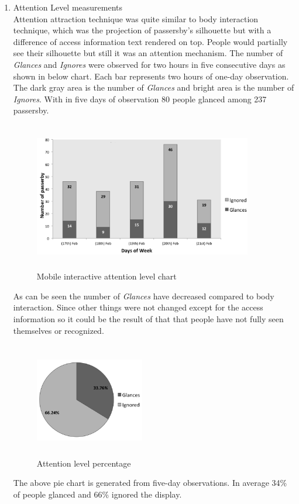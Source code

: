 \begin{enumerate}

\item Attention Level measurements \\
Attention attraction technique was quite similar to body interaction technique, which was the projection of passersby's silhouette but with a difference of access information text rendered on top. People would partially see their silhouette but still it was an attention mechanism.
The number of \emph{Glances} and \emph{Ignores} were observed for two hours in five consecutive days as shown in below chart. Each bar represents two hours of one-day observation. The dark gray area is the number of \emph{Glances} and bright area is the number of \emph{Ignores}. With in five days of observation 80 people glanced among 237 passersby. 


\begin{figure}[H]
    \centering
    \includegraphics[width=0.9\textwidth,height=6.5cm]{Figures/8/mobile_inter_findings/mobile_Inter_chart}%
    \caption{Mobile interactive attention level chart}%
    \label{fig:mobileattentionlevelchart}%
\end{figure}

As can be seen the number of \emph{Glances} have decreased compared to body interaction. Since other things were not changed except for the access information so it could be the result of that that people have not fully seen themselves or recognized. 

\begin{figure}[H]
    \centering
    \includegraphics[width=0.45\textwidth,height=5cm]{Figures/8/mobile_inter_findings/mobile_inter_percentage}
    \caption{Attention level percentage}%
    \label{fig:bodyattentionlevelpercentage}%
\end{figure}
The above pie chart is generated from five-day observations. In average 34\% of people glanced and 66\% ignored the display. 



\end{enumerate}
